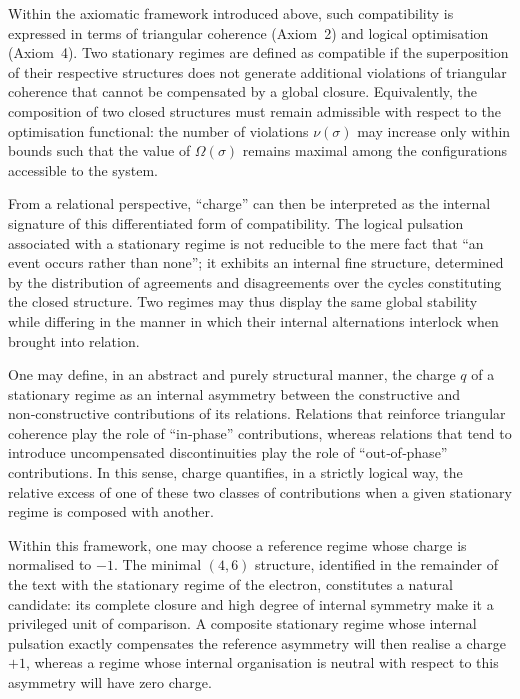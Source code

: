 \documentclass[11pt,a4paper]{article}
\begin{document}
Within the axiomatic framework introduced above, such compatibility is expressed in terms of triangular coherence (Axiom~2) and logical optimisation (Axiom~4). Two stationary regimes are defined as compatible if the superposition of their respective structures does not generate additional violations of triangular coherence that cannot be compensated by a global closure. Equivalently, the composition of two closed structures must remain admissible with respect to the optimisation functional: the number of violations \(\nu(\sigma)\) may increase only within bounds such that the value of \(\Omega(\sigma)\) remains maximal among the configurations accessible to the system. 

From a relational perspective, “charge” can then be interpreted as the internal signature of this differentiated form of compatibility. The logical pulsation associated with a stationary regime is not reducible to the mere fact that “an event occurs rather than none”; it exhibits an internal fine structure, determined by the distribution of agreements and disagreements over the cycles constituting the closed structure. Two regimes may thus display the same global stability while differing in the manner in which their internal alternations interlock when brought into relation.

One may define, in an abstract and purely structural manner, the charge \(q\) of a stationary regime as an internal asymmetry between the constructive and non‑constructive contributions of its relations. Relations that reinforce triangular coherence play the role of “in‑phase” contributions, whereas relations that tend to introduce uncompensated discontinuities play the role of “out‑of‑phase” contributions. In this sense, charge quantifies, in a strictly logical way, the relative excess of one of these two classes of contributions when a given stationary regime is composed with another. 

Within this framework, one may choose a reference regime whose charge is normalised to \(-1\). The minimal \((4,6)\) structure, identified in the remainder of the text with the stationary regime of the electron, constitutes a natural candidate: its complete closure and high degree of internal symmetry make it a privileged unit of comparison. A composite stationary regime whose internal pulsation exactly compensates the reference asymmetry will then realise a charge \(+1\), whereas a regime whose internal organisation is neutral with respect to this asymmetry will have zero charge. 
\end{document}
